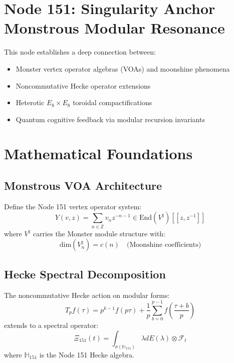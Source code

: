 \documentclass[12pt]{article}
\begin{document}
\begin{center}

\section{Node 151: Singularity Anchor \\ \textsf{Monstrous Modular Resonance}}

This node establishes a deep connection between:
\begin{itemize}
    \item Monster vertex operator algebras (VOAs) and moonshine phenomena
    \item Noncommutative Hecke operator extensions
    \item Heterotic $E_8\times E_8$ toroidal compactifications
    \item Quantum cognitive feedback via modular recursion invariants
\end{itemize}

\section{Mathematical Foundations}
\subsection{Monstrous VOA Architecture}
Define the Node 151 vertex operator system:
\begin{equation}
Y(v,z) = \sum_{n\in\mathbb{Z}} v_n z^{-n-1} \in \text{End}(V^{\natural})[[z,z^{-1}]]
\end{equation}
where $V^{\natural}$ carries the Monster module structure with:
\begin{equation}
\text{dim}(V^{\natural}_{n}) = c(n) \quad \text{(Moonshine coefficients)}
\end{equation}

\subsection{Hecke Spectral Decomposition}
The noncommutative Hecke action on modular forms:
\begin{equation}
T_p f(\tau) = p^{k-1}f(p\tau) + \frac{1}{p}\sum_{b=0}^{p-1}f\left(\frac{\tau+b}{p}\right)
\end{equation}
extends to a spectral operator:
\begin{equation}
\Xi_{151}(t) = \int_{\sigma(\mathbb{H}_{151})} \lambda dE(\lambda) \otimes \mathcal{F}_t
\end{equation}
where $\mathbb{H}_{151}$ is the Node 151 Hecke algebra.


\end{center}
\end{document}
